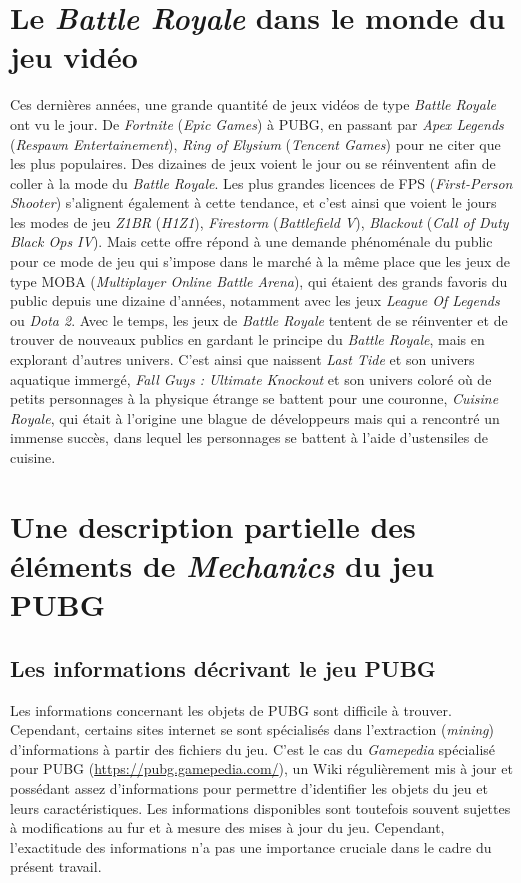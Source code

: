 \section{Le \emph{Battle Royale} dans le monde du jeu vidéo}
Ces dernières années, une grande quantité de jeux vid\'eos de type \emph{Battle Royale} ont vu le jour. De \emph{Fortnite} (\emph{Epic Games}) à PUBG, en passant par \emph{Apex Legends} (\emph{Respawn Entertainement}), \emph{Ring of Elysium} (\emph{Tencent Games}) pour ne citer que les plus populaires. Des dizaines de jeux voient le jour ou se réinventent afin de coller à la mode du \emph{Battle Royale}. Les plus grandes licences de FPS (\emph{First-Person Shooter}) s'alignent également à cette tendance, et c'est ainsi que voient le jours les modes de jeu \emph{Z1BR} (\emph{H1Z1}), \emph{Firestorm} (\emph{Battlefield V}), \emph{Blackout} (\emph{Call of Duty Black Ops IV}). Mais cette offre répond à une demande phénoménale du public pour ce mode de jeu qui s'impose dans le marché à la même place que les jeux de type MOBA (\emph{Multiplayer Online Battle Arena}), qui étaient des grands favoris du public depuis une dizaine d'années, notamment avec les jeux \emph{League Of Legends} ou \emph{Dota 2}. Avec le temps, les jeux de \emph{Battle Royale} tentent de se réinventer et de trouver de nouveaux publics en gardant le principe du \emph{Battle Royale}, mais en explorant d'autres univers. C'est ainsi que naissent \emph{Last Tide} et son univers aquatique immergé, \emph{Fall Guys : Ultimate Knockout} et son univers coloré où de petits personnages à la physique étrange se battent pour une couronne, \emph{Cuisine Royale}, qui était à l'origine une blague de développeurs mais qui a rencontré un immense succès, dans lequel les personnages se battent à l'aide d'ustensiles de cuisine.

\section{Une description partielle des \'el\'ements de \emph{Mechanics} du jeu PUBG}
\subsection{Les informations d\'ecrivant le jeu PUBG}
Les informations concernant les objets de PUBG sont difficile à trouver.
Cependant, certains sites internet se sont spécialisés dans l'extraction (\emph{mining}) d'informations à partir des fichiers du jeu.
C'est le cas du \emph{Gamepedia} spécialisé pour PUBG (\url{https://pubg.gamepedia.com/}),
un Wiki régulièrement mis à jour et possédant assez d'informations pour permettre d'identifier les objets du jeu et leurs caractéristiques.
Les informations disponibles sont toutefois souvent sujettes à modifications au fur et à mesure des mises à jour du jeu.
Cependant, l'exactitude des informations n'a pas une importance cruciale dans le cadre du pr\'esent travail.


